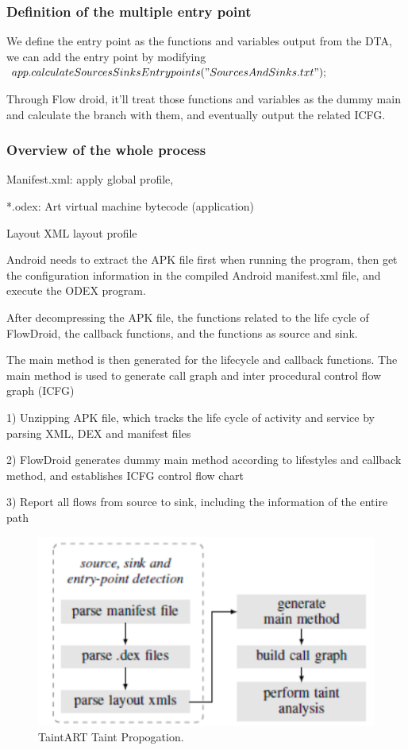 \documentclass{article}
\begin{document}
\subsubsection{Definition of the multiple entry point}

We define the entry point as the functions and variables output from the DTA, we can add the entry point by modifying $app.calculateSourcesSinksEntrypoints("SourcesAndSinks.txt");$

Through Flow droid, it'll treat those functions and variables as the dummy main and calculate the branch with them, and eventually output the related ICFG.

\subsubsection{Overview of the whole process}

Manifest.xml: apply global profile,

*.odex: Art virtual machine bytecode (application)

Layout XML layout profile

Android needs to extract the APK file first when running the program, then get the configuration information in the compiled Android manifest.xml file, and execute the ODEX program.

After decompressing the APK file, the functions related to the life cycle of FlowDroid, the callback functions, and the functions as source and sink.

The main method is then generated for the lifecycle and callback functions. The main method is used to generate call graph and inter procedural control flow graph (ICFG)

1) Unzipping APK file, which tracks the life cycle of activity and service by parsing XML, DEX and manifest files

2) FlowDroid generates dummy main method according to lifestyles and callback method, and establishes ICFG control flow chart

3) Report all flows from source to sink, including the information of the entire path

\begin{figure}[ht]
  \centering
  \includegraphics[scale=0.4]{FlowDroid3.png}
  \caption{TaintART Taint Propogation.}
  \label{fig:Overview of the whole process}
\end{figure}
\end{document}
